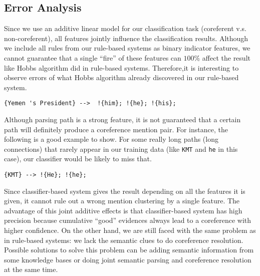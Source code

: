 \documentclass[letterpaper]{article}
\begin{document}
\subsection{Error Analysis}
Since we use an additive linear model for our classification task (coreferent v.s. non-coreferent), all features jointly influence the classification results.
Although we include all rules from our rule-based systems as binary indicator features, we cannot guarantee that a single ``fire'' of these features can $100\%$ affect the result like Hobbs algorithm did in rule-based systems.
Therefore,it is interesting to observe errors of what Hobbs algorithm already discovered in our rule-based system.
\begin{verbatim}
{Yemen 's President} -->  !{him}; !{he}; !{his}; 
\end{verbatim}
Although parsing path is a strong feature, it is not guaranteed that a certain path will definitely produce a coreference mention pair. For instance, the following is a good example to show. For some really long paths (long connections) that rarely appear in our training data (like \texttt{KMT} and \texttt{he} in this case), our classifier would be likely to miss that.
\begin{verbatim}
{KMT} --> !{He}; !{he};
\end{verbatim}
Since classifier-based system gives the result depending on all the features it is given, it cannot rule out a wrong mention clustering by a single feature.
The advantage of this joint additive effects is that classifier-based system has high precision because cumulative ``good'' evidences always lead to a coreference with higher confidence. On the other hand, we are still faced with the same problem as in rule-based systems: we lack the semantic clues to do coreference resolution. Possible solutions to solve this problem can be adding semantic information from some knowledge bases or doing joint semantic parsing and coreference resolution at the same time.
\end{document}
